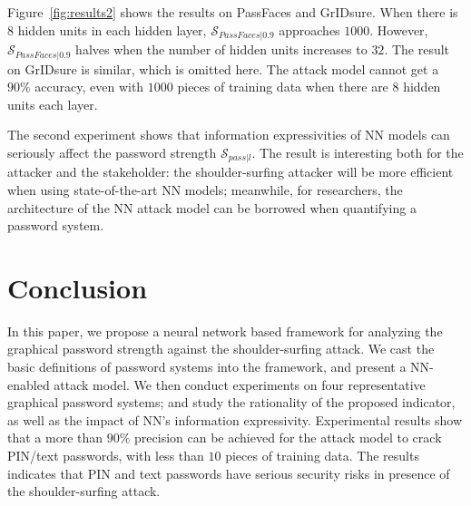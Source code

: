 \documentclass{article}
\begin{document}
Figure~\ref{fig:results2} shows the results on PassFaces and GrIDsure. When there is $8$ hidden units in each hidden layer, $\mathcal{S}_{PassFaces|0.9}$ approaches $1000$. However, $\mathcal{S}_{PassFaces|0.9}$ halves when the number of hidden units increases to $32$. The result on GrIDsure is similar, which is omitted here. The attack model cannot get a $90\%$ accuracy, even with $1000$ pieces of training data when there are $8$ hidden units each layer.

The second experiment shows that information expressivities of NN models can seriously affect the password strength $\mathcal{S}_{pass|l}$.
The result is interesting both for the attacker and the stakeholder: the shoulder-surfing attacker will be more efficient when using state-of-the-art NN models; meanwhile, for researchers, the architecture of the NN attack model can be borrowed when quantifying a password system.


\section{Conclusion} \label{sec:conclusion}
In this paper, we propose a neural network based framework for analyzing the graphical password strength against the shoulder-surfing attack. We cast the basic definitions of password systems into the framework, and present a NN-enabled attack model. We then conduct experiments on four representative graphical password systems; and study the rationality of the proposed indicator, as well as the impact of NN's information expressivity. Experimental results show that a more than $90\%$ precision can be achieved for the attack model to crack PIN/text passwords, with less than $10$ pieces of training data.  The results indicates that PIN and text passwords have serious security risks in presence of the shoulder-surfing attack. 


\end{document}
